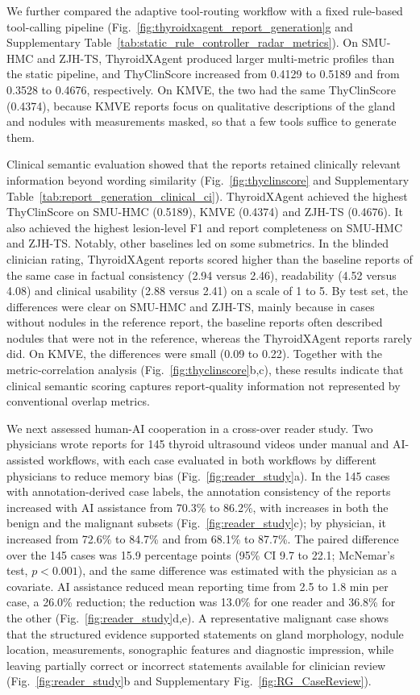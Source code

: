 \documentclass[fleqn,10pt]{wlscirep}
\begin{document}
We further compared the adaptive tool-routing workflow with a fixed rule-based tool-calling pipeline (Fig.~\ref{fig:thyroidxagent_report_generation}g and Supplementary Table~\ref{tab:static_rule_controller_radar_metrics}). On SMU-HMC and ZJH-TS, ThyroidXAgent produced larger multi-metric profiles than the static pipeline, and ThyClinScore increased from 0.4129 to 0.5189 and from 0.3528 to 0.4676, respectively. On KMVE, the two had the same ThyClinScore (0.4374), because KMVE reports focus on qualitative descriptions of the gland and nodules with measurements masked, so that a few tools suffice to generate them.

Clinical semantic evaluation showed that the reports retained clinically relevant information beyond wording similarity (Fig.~\ref{fig:thyclinscore} and Supplementary Table~\ref{tab:report_generation_clinical_ci}). ThyroidXAgent achieved the highest ThyClinScore on SMU-HMC (0.5189), KMVE (0.4374) and ZJH-TS (0.4676). It also achieved the highest lesion-level F1 and report completeness on SMU-HMC and ZJH-TS. Notably, other baselines led on some submetrics. In the blinded clinician rating, ThyroidXAgent reports scored higher than the baseline reports of the same case in factual consistency (2.94 versus 2.46), readability (4.52 versus 4.08) and clinical usability (2.88 versus 2.41) on a scale of 1 to 5. By test set, the differences were clear on SMU-HMC and ZJH-TS, mainly because in cases without nodules in the reference report, the baseline reports often described nodules that were not in the reference, whereas the ThyroidXAgent reports rarely did. On KMVE, the differences were small (0.09 to 0.22). Together with the metric-correlation analysis (Fig.~\ref{fig:thyclinscore}b,c), these results indicate that clinical semantic scoring captures report-quality information not represented by conventional overlap metrics.

We next assessed human-AI cooperation in a cross-over reader study. Two physicians wrote reports for 145 thyroid ultrasound videos under manual and AI-assisted workflows, with each case evaluated in both workflows by different physicians to reduce memory bias (Fig.~\ref{fig:reader_study}a). In the 145 cases with annotation-derived case labels, the annotation consistency of the reports increased with AI assistance from 70.3\% to 86.2\%, with increases in both the benign and the malignant subsets (Fig.~\ref{fig:reader_study}c); by physician, it increased from 72.6\% to 84.7\% and from 68.1\% to 87.7\%. The paired difference over the 145 cases was 15.9 percentage points (95\% CI 9.7 to 22.1; McNemar's test, \(p<0.001\)), and the same difference was estimated with the physician as a covariate. AI assistance reduced mean reporting time from 2.5 to 1.8 min per case, a 26.0\% reduction; the reduction was 13.0\% for one reader and 36.8\% for the other (Fig.~\ref{fig:reader_study}d,e). A representative malignant case shows that the structured evidence supported statements on gland morphology, nodule location, measurements, sonographic features and diagnostic impression, while leaving partially correct or incorrect statements available for clinician review (Fig.~\ref{fig:reader_study}b and Supplementary Fig.~\ref{fig:RG_CaseReview}).
\end{document}
